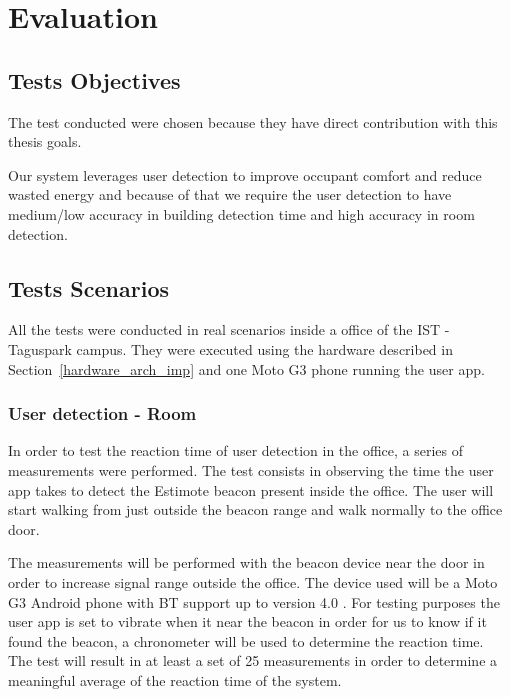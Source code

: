 \chapter{Evaluation}
\label{chapter:evaluation}

\section{Tests Objectives}

The test conducted were chosen because they have direct contribution with this thesis goals.

Our system leverages user detection to improve occupant comfort and reduce wasted energy and because of that we require the user detection to have medium/low accuracy in building detection time and high accuracy in room detection.




\section{Tests Scenarios}



All the tests were conducted in real scenarios inside a office of the IST - Taguspark campus. They
were executed using the hardware described in Section~\ref{hardware_arch_imp} and one Moto G3 phone running the user app.


\subsection{User detection - Room}



In order to test the reaction time of user detection in the office, a series of measurements
were performed. The test consists in observing the time the user app takes to detect the Estimote beacon present inside the office. The user will start walking from just outside the beacon range and walk normally to the office door.

The measurements will be performed with the beacon device near the door in order to increase signal range outside the office. The device used will be a Moto G3 Android phone with BT support up to version 4.0 .
For testing purposes the user app is set to vibrate when it near the beacon in order for us to know if it found the beacon, a chronometer will be used to determine the reaction time. The test will result in at least a set of 25 measurements in order to determine a meaningful average of the reaction time of the system.


